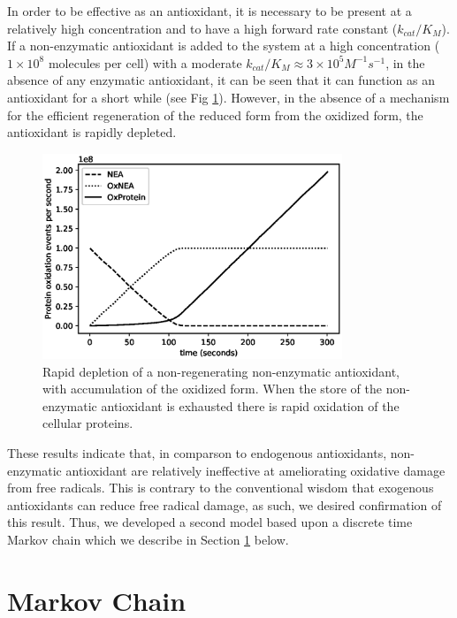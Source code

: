 \documentclass[preprint,12pt,authoryear]{elsarticle}
\begin{document}
In order to be effective as an antioxidant, it is necessary to be
present at a relatively high concentration and to have a high forward rate constant ($k_{cat}/K_M$).
If a non-enzymatic antioxidant is added to the system at a high concentration
($1 \times 10^8$ molecules per cell) with a moderate $k_{cat}/K_M \approx 3 \times 10^5 M^{-1} s^{-1}$, in the absence of any
enzymatic antioxidant, it can be seen that it can function as an antioxidant for a short while (see Fig \ref{fig:g3}).
However, in the absence of a mechanism for the efficient regeneration of the
reduced form from the oxidized form, the antioxidant is rapidly depleted.


\begin{figure}
\begin{center}
\includegraphics[width=0.8\textwidth]{Fig3.eps}
\end{center}
\caption{\label{fig:g3} Rapid depletion of a non-regenerating non-enzymatic antioxidant, with accumulation of the
oxidized form. When the store of the non-enzymatic antioxidant is exhausted there is rapid oxidation of
the cellular proteins.}
\end{figure}

These results indicate that, in comparson to endogenous antioxidants, non-enzymatic antioxidant are relatively ineffective at ameliorating oxidative damage from free radicals.
This is contrary to the conventional wisdom that exogenous antioxidants can reduce free radical damage, as such, we desired confirmation of this result. Thus, we developed a
second model based upon a discrete time Markov chain which we describe in  Section \ref{sec:mm} below.

\section{Markov Chain}
\label{sec:mm}
\end{document}

